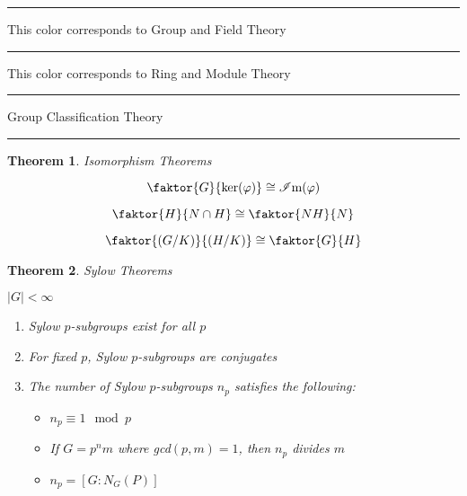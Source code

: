 \documentclass[12pt]{Qual}
\newtheorem{theorem}{Theorem}
\begin{document}
\vspace{-0.5cm} \noindent\textcolor{red!60!black}{\rule{3cm}{1mm}} This color corresponds to Group and Field Theory

\noindent\textcolor{blue!60!black}{\rule{3cm}{1mm}} This color corresponds to Ring and Module Theory
\begin{center}
\noindent\textcolor{red!60!black}{\rule{15cm}{1mm}}
\Huge \faBug\faPuzzlePiece\faCoffee Group Classification Theory \faCoffee\faPuzzlePiece\faBug
\vspace{-0.5cm}
\noindent\textcolor{red!60!black}{\rule{15cm}{1mm}}
\end{center}
\vspace{0.5cm}
\begin{theorem}{\Large\textit{Isomorphism Theorems}}

\begin{minipage}{0.3\textwidth}
$$\faktor{G}{\ker(\varphi)}\cong\im(\varphi)$$
\end{minipage}\hspace{0.25cm}\begin{minipage}{0.3\textwidth}
$$\faktor{H}{N\cap H}\cong \faktor{NH}{N}$$
\end{minipage}\hspace{0.35cm}\begin{minipage}{0.3\textwidth}
$$\faktor{(G/K)}{(H/K)}\cong \faktor{G}{H}$$
\end{minipage}

\end{theorem}
\vspace{0.5cm}
\begin{theorem}{\Large\textit{Sylow Theorems}}

 $|G|<\infty$


\begin{enumerate}[label=(\arabic*),leftmargin=3cm]
    \item Sylow $p$-subgroups exist for all $p$
    \item For fixed $p$, Sylow $p$-subgroups are conjugates
    \item The number of Sylow $p$-subgroups $n_p$ satisfies the following:
    \begin{itemize}
\renewcommand\labelitemi{\faPuzzlePiece}
    \item $n_p\equiv 1\mod p$
    \item If $G=p^nm$ where gcd$(p,m)=1$, then $n_p$ divides $m$
    \item $n_p=[G:N_G(P)]$
\end{itemize}
\end{enumerate}
\end{theorem}
\end{document}
